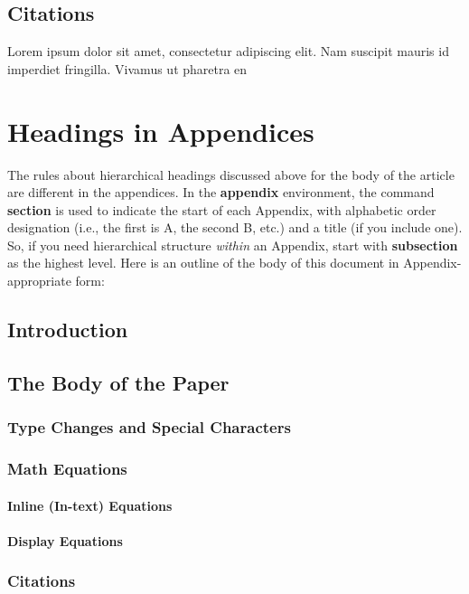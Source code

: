 \subsection{Citations}
Lorem ipsum dolor sit amet, consectetur adipiscing elit. Nam suscipit mauris id imperdiet fringilla. Vivamus ut pharetra en





\appendix
\section{Headings in Appendices}
The rules about hierarchical headings discussed above for
the body of the article are different in the appendices.
In the \textbf{appendix} environment, the command
\textbf{section} is used to
indicate the start of each Appendix, with alphabetic order
designation (i.e., the first is A, the second B, etc.) and
a title (if you include one).  So, if you need
hierarchical structure
\textit{within} an Appendix, start with \textbf{subsection} as the
highest level. Here is an outline of the body of this
document in Appendix-appropriate form:
\subsection{Introduction}
\subsection{The Body of the Paper}
\subsubsection{Type Changes and  Special Characters}
\subsubsection{Math Equations}
\paragraph{Inline (In-text) Equations}
\paragraph{Display Equations}
\subsubsection{Citations}
